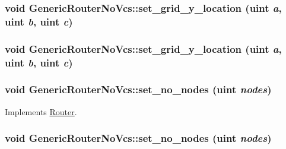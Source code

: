 \hypertarget{classGenericRouterNoVcs_30fb743466538fcf9d158ffa665f9ca2}{
\subsubsection[{set\_\-grid\_\-y\_\-location}]{\setlength{\rightskip}{0pt plus 5cm}void GenericRouterNoVcs::set\_\-grid\_\-y\_\-location ({\bf uint} {\em a}, \/  {\bf uint} {\em b}, \/  {\bf uint} {\em c})}}
\label{classGenericRouterNoVcs_30fb743466538fcf9d158ffa665f9ca2}


\hypertarget{classGenericRouterNoVcs_30fb743466538fcf9d158ffa665f9ca2}{
\subsubsection[{set\_\-grid\_\-y\_\-location}]{\setlength{\rightskip}{0pt plus 5cm}void GenericRouterNoVcs::set\_\-grid\_\-y\_\-location ({\bf uint} {\em a}, \/  {\bf uint} {\em b}, \/  {\bf uint} {\em c})}}
\label{classGenericRouterNoVcs_30fb743466538fcf9d158ffa665f9ca2}


\hypertarget{classGenericRouterNoVcs_877a1b3fac555ef48ad7690429b2be28}{
\subsubsection[{set\_\-no\_\-nodes}]{\setlength{\rightskip}{0pt plus 5cm}void GenericRouterNoVcs::set\_\-no\_\-nodes ({\bf uint} {\em nodes})}}
\label{classGenericRouterNoVcs_877a1b3fac555ef48ad7690429b2be28}




Implements \hyperlink{classRouter_33073537e883e8bea1a25690bcb70049}{Router}.\hypertarget{classGenericRouterNoVcs_877a1b3fac555ef48ad7690429b2be28}{
\subsubsection[{set\_\-no\_\-nodes}]{\setlength{\rightskip}{0pt plus 5cm}void GenericRouterNoVcs::set\_\-no\_\-nodes ({\bf uint} {\em nodes})}}
\label{classGenericRouterNoVcs_877a1b3fac555ef48ad7690429b2be28}


